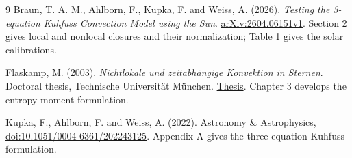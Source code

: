 \documentclass[11pt]{article}
\numberwithin{equation}{section}
\begin{document}
\begingroup
\small
\begin{thebibliography}{9}
Braun, T. A. M., Ahlborn, F., Kupka, F. and Weiss, A. (2026).
\emph{Testing the 3-equation Kuhfuss Convection Model using the Sun}.
\href{https://arxiv.org/html/2604.06151v1}{arXiv:2604.06151v1}.
Section 2 gives local and nonlocal closures and their normalization;
Table 1 gives the solar calibrations.

Flaskamp, M. (2003). \emph{Nichtlokale und zeitabh\"angige
Konvektion in Sternen}.
Doctoral thesis, Technische Universit\"at M\"unchen.
\href{https://mediatum.ub.tum.de/doc/602965/602965.pdf}{Thesis}.
Chapter 3 develops the entropy moment formulation.

Kupka, F., Ahlborn, F. and Weiss, A. (2022).
\href{https://doi.org/10.1051/0004-6361/202243125}
{Astronomy \& Astrophysics, doi:10.1051/0004-6361/202243125}.
Appendix A gives the three equation Kuhfuss formulation.
\end{thebibliography}
\endgroup
\end{document}
